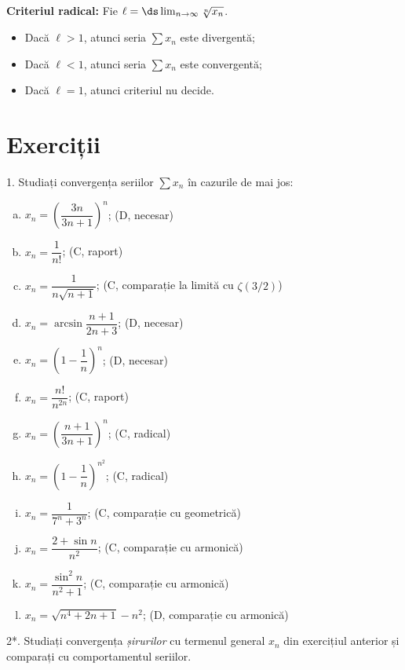 \textbf{Criteriul radical:} Fie $ \ell = \ds\lim_{n \to \infty} \sqrt[n]{x_n} $.
\begin{itemize}
    \item Dacă $ \ell > 1 $, atunci seria $ \sum x_n $ este divergentă;
    \item Dacă $ \ell < 1 $, atunci seria $ \sum x_n $ este convergentă;
    \item Dacă $ \ell = 1 $, atunci criteriul nu decide.
\end{itemize}

\newpage
\section{Exerciții}

1. Studiați convergența seriilor $ \sum x_n $ în cazurile de mai jos:
\begin{enumerate}[(a)]
    \item $ x_n = \left( \dfrac{3n}{3n + 1} \right)^n $; \hfill(D, necesar)
    \item $ x_n = \dfrac{1}{n!} $; \hfill(C, raport)
    \item $ x_n = \dfrac{1}{n\sqrt{n + 1}} $; \hfill(C, comparație la limită cu $\zeta(3/2)$)
    \item $ x_n = \arcsin \dfrac{n+1}{2n + 3} $; \hfill(D, necesar)
    \item $ x_n = \left( 1 - \dfrac{1}{n} \right)^n $; \hfill(D, necesar)
    \item $ x_n = \dfrac{n!}{n^{2n}} $; \hfill(C, raport)
    \item $ x_n = \left( \dfrac{n + 1}{3n + 1}\right)^n $; \hfill(C, radical)
    \item $ x_n = \left( 1 - \dfrac{1}{n} \right)^{n^2} $; \hfill(C, radical)
    \item $ x_n = \dfrac{1}{7^n + 3^n} $; \hfill(C, comparație cu geometrică)
    \item $ x_n = \dfrac{2 + \sin n}{n^2} $; \hfill(C, comparație cu armonică)
    \item $ x_n = \dfrac{\sin^2 n}{n^2 + 1} $; \hfill(C, comparație cu armonică)
    \item $ x_n = \sqrt{n^4 + 2n + 1} - n^2 $; \hfill(D, comparație cu armonică)
\end{enumerate}

2*. Studiați convergența \emph{șirurilor} cu termenul general $ x_n $ din
exercițiul anterior și comparați cu comportamentul seriilor.

